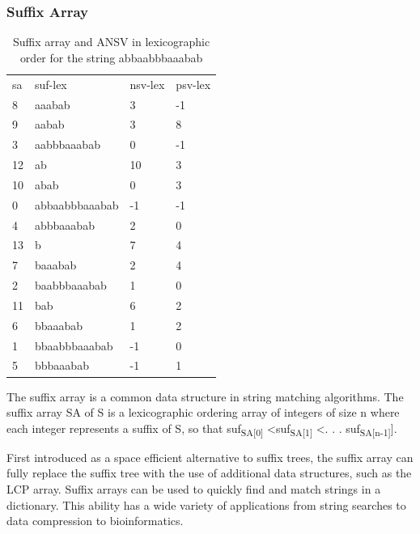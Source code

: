 \subsubsection{Suffix Array}

\begin{table}[ht!]
\centering
\begin{tabular}{llll}
sa & suf-lex        & nsv-lex & psv-lex \\
8  & aaabab         & 3       & -1      \\
9  & aabab          & 3       & 8       \\
3  & aabbbaaabab    & 0       & -1      \\
12 & ab             & 10      & 3       \\
10 & abab           & 0       & 3       \\
0  & abbaabbbaaabab & -1      & -1      \\
4  & abbbaaabab     & 2       & 0       \\
13 & b              & 7       & 4       \\
7  & baaabab        & 2       & 4       \\
2  & baabbbaaabab   & 1       & 0       \\
11 & bab            & 6       & 2       \\
6  & bbaaabab       & 1       & 2       \\
1  & bbaabbbaaabab  & -1      & 0       \\
5  & bbbaaabab      & -1      & 1      
\end{tabular}
\caption{Suffix array and ANSV in lexicographic order for the string abbaabbbaaabab}
\label{tab:sa}
\end{table}

The suffix array is a common data structure in string matching algorithms.
The suffix array SA of S is a lexicographic ordering array of integers of size n where each integer represents a suffix of S, so that suf\textsubscript{SA[0]} \textless suf\textsubscript{SA[1]} \textless . . . suf\textsubscript{SA[n-1]}].

First introduced as a space efficient alternative to suffix trees, the suffix array can fully replace the suffix tree with the use of additional data structures, such as the LCP array.
Suffix arrays can be used to quickly find and match strings in a dictionary.
This ability has a wide variety of applications from string searches to data compression to bioinformatics.

